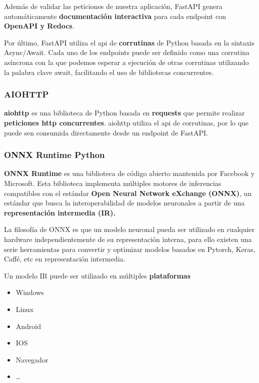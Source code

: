 Además de validar las peticiones de nuestra aplicación, FastAPI genera
automáticamente \textbf{documentación interactiva} para cada endpoint
con \textbf{OpenAPI y Redocs}.

Por último, FastAPI utiliza el api de \textbf{corrutinas} de Python
basada en la sintaxis Async/Await. Cada uno de los endpoints puede ser
definido como una corrutina asíncrona con la que podemos esperar a
ejecución de otras corrutinas utilizando la palabra clave await,
facilitando el uso de bibliotecas concurrentes.

\hypertarget{aiohttp}{%
\subsubsection{AIOHTTP}\label{aiohttp}}

\textbf{aiohttp} es una biblioteca de Python basada en \textbf{requests}
que permite realizar \textbf{peticiones http concurrentes}. aiohttp
utiliza el api de corrutinas, por lo que puede sen consumida
directamente desde un endpoint de FastAPI.

\hypertarget{section-1}{%
\subsubsection{}\label{section-1}}

\hypertarget{onnx-runtime-python}{%
\subsubsection{ONNX Runtime Python}\label{onnx-runtime-python}}

\textbf{ONNX Runtime} es una biblioteca de código abierto mantenida por
Facebook y Microsoft. Esta biblioteca implementa múltiples motores de
inferencias compatibles con el estándar \textbf{Open Neural Network
eXchange (ONNX)}, un estándar que busca la interoperabilidad de modelos
neuronales a partir de una \textbf{representación intermedia (IR).}

La filosofía de ONNX es que un modelo neuronal pueda ser utilizado en
cualquier hardware independientemente de su representación interna, para
ello existen una serie herramientas para convertir y optimizar modelos
basados en Pytorch, Keras, Caffé, etc en representación intermedia.

Un modelo IR puede ser utilizado en múltiples \textbf{plataformas}

\begin{itemize}
\item
  Windows
\item
  Linux
\item
  Android
\item
  IOS
\item
  Navegador
\item
  \ldots{}
\end{itemize}

